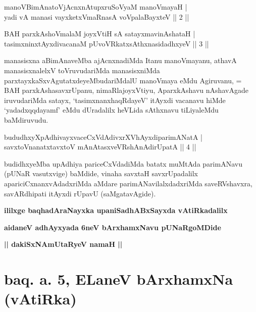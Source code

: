 \begin{shl}
manoVBimAnatoV\s jAcnxnAtupxruSoV\s yaM manoVmayaH | \\
yadi vA manasi vayxketxVmaRnasA voVpalaBayxteV \hfill ||  2 || 
\end{shl}

\begin{shl}
BAH parxkAshoV\s malaM joyxVtiH sA satayxmavinAshataH  | \\
tasimxninxtAyxdivacanaM pUvoVRkatxsAthxnasidadhxyeV \hfill ||  3 || 
\end{shl}

\begin{artha}
manasisxna aBimAnaveMba ajAcnxnadiMda Itanu manoVmayanu, athavA manasisxnalelxV toVruvudariMda manasisxniMda parxtayxkaSxvAgutatxdeyeMbudariMdalU manoVmaya eMdu Agiruvanu, = BAH parxkAshasavxrUpanu, nimaRlajoyxVtiyu, AparxkAshavu nAshavAgade iruvudariMda satayx, `tasimxnanxhaqRdayeV' itAyxdi vacanavu hiMde `yadadxqqdayamf' eMdu dUradalilx heVLida sAthxnavu tiLiyaleMdu baMdiruvudu.
\end{artha}


\begin{shl}
bududhxyXpAdhivayxvaceCxVdAdivxrXVhAyxdiparimANatA | \\
savxtoV\s nanatxtavxtoV mAnAtasxveVRshAnAdirUpatA \hfill ||  4 || 
\end{shl}

\begin{artha}
budidhxyeMba upAdhiya pariceCxVdadiMda batatx muMtAda parimANavu (pUNaR vasutxvige) baMdide, vinaha savxtaH savxrUpadalilx apariciCxnanxvAdadxriMda aMdare parimANavilalxdadxriMda saveRVshavxra, savARdhipati itAyxdi rUpavU (saMgatavAgide).
\end{artha}

\begin{center}
{\bf ililxge baqhadAraNayxka upaniSadhABxSayxda vAtiRkadalilx}
\smallskip

{\bf aidaneV adhAyxyada 6neV bArxhamxNavu pUNaRgoMDide}
\smallskip

{\bf || dakiSxNAmUtaRyeV namaH ||}
\end{center}

\section*{baq. a. 5, ELaneV bArxhamxNa (vAtiRka)}

